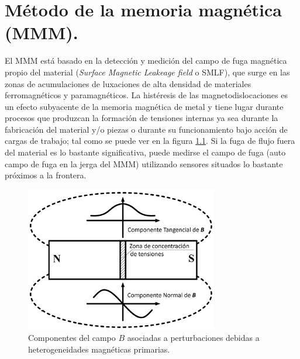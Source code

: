 

\chapter{Método de la memoria magnética (MMM).} %

\label{AppendixMetodoDeLaMemoriaMagnetica} %




El MMM \citep{Dubov:1} está basado en la detección y medición del campo de fuga magnética propio del material (\textit{Surface Magnetic Leakeage field} o SMLF), que surge en las zonas de acumulaciones de luxaciones de alta densidad de materiales ferromagnéticos y  paramagnéticos. La histéresis de las magnetodislocaciones es un efecto subyacente de la memoria magnética de metal y tiene lugar durante procesos que produzcan la formación de tensiones internas ya sea durante la fabricación del material y/o piezas o durante su funcionamiento bajo acción de cargas de trabajo; tal como se puede ver en la figura \ref{fig:metals-09-00661-g001}. Si la fuga de flujo fuera del material es lo bastante significativa, puede medirse el campo de fuga (auto campo de fuga en la jerga del MMM) utilizando sensores situados lo bastante próximos a la frontera\citep{ForceMMM}. 

\begin{figure}[h]
	\centering
	\includegraphics[width=0.75\textwidth]{./Figures/metals-09-00661-g001.jpg}
	\caption{Componentes del campo $B$ asociadas a perturbaciones debidas a heterogeneidades magnéticas primarias\protect\footnotemark.}
	\label{fig:metals-09-00661-g001}
\end{figure}

